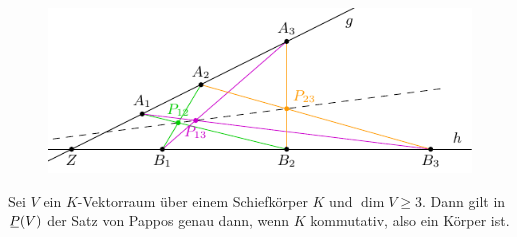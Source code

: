 \documentclass[
 a4paper,
 12pt,
 parskip=half
 ]{scrartcl}
\theoremstyle{plain}
\theoremstyle{definition}
\begin{document}
\newpage

\begin{figure}[ht]
 \center
 \includegraphics[width=12cm]{img/pappos}
\end{figure}

\begin{thm}
 Sei $V$ ein $K$-Vektorraum über einem Schiefkörper $K$ und $\dim V \ge 3$. Dann gilt in $\proj(V)$ der Satz von Pappos genau dann, wenn $K$ kommutativ, also ein Körper ist.
\end{thm}
\end{document}
